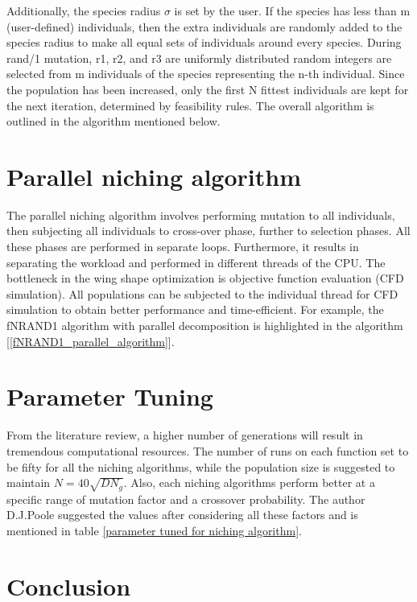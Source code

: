 Additionally, the species radius $\sigma$ is set by the user. If the species has less than m (user-defined) individuals, then the extra individuals are randomly added to the species radius to make all equal sets of individuals around every species. During rand/1 mutation, r1, r2, and r3 are uniformly distributed random integers are selected from m individuals of the species representing the n-th individual. Since the population has been increased, only the first N fittest individuals are kept for the next iteration, determined by feasibility rules. The overall algorithm is outlined in the algorithm mentioned below.


\section{Parallel niching algorithm}
The parallel niching algorithm involves performing mutation to all individuals, then subjecting all individuals to cross-over phase, further to selection phases. All these phases are performed in separate loops. Furthermore, it results in separating the workload and performed in different threads of the CPU. The bottleneck in the wing shape optimization is objective function evaluation (CFD simulation). All populations can be subjected to the individual thread for CFD simulation to obtain better performance and time-efficient. For example, the fNRAND1 algorithm with parallel decomposition is highlighted in the algorithm [\ref{fNRAND1_parallel_algorithm}].

\section{Parameter Tuning}
From the literature review, a higher number of generations will result in tremendous computational resources. The number of runs on each function set to be fifty for all the niching algorithms, while the population size is suggested to maintain $N=40 \sqrt{D N_{g}}$. Also, each niching algorithms perform better at a specific range of mutation factor and a crossover probability. The author D.J.Poole\cite{Poole3} suggested the values after considering all these factors and is mentioned in table \ref{parameter tuned for niching algorithm}. 


\section{Conclusion}

